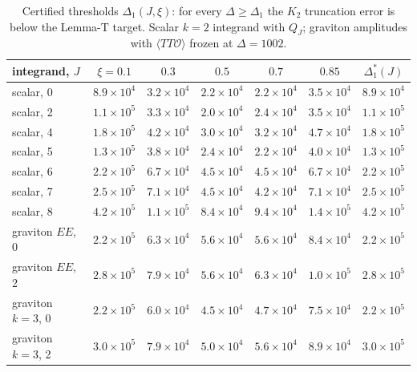 \documentclass[aps,prl,onecolumn,superscriptaddress,nofootinbib]{revtex4-2}
\begin{document}
\begin{table}[!htbp]
\caption{\label{tab:delta1}Certified thresholds $\Delta_1(J,\xi)$: for every $\Delta\ge\Delta_1$ the $K_2$ truncation error is below
the Lemma-T target. Scalar $k=2$ integrand with $Q_J$; graviton amplitudes with $\langle TT\mathcal O\rangle$ frozen at $\Delta=1002$.}
\footnotesize
\begin{ruledtabular}
\begin{tabular}{lcccccc}
integrand, $J$ & $\xi=0.1$ & $0.3$ & $0.5$ & $0.7$ & $0.85$ & $\Delta_1^*(J)$\\\hline
scalar, 0 & $8.9\times10^4$ & $3.2\times10^4$ & $2.2\times10^4$ & $2.2\times10^4$ & $3.5\times10^4$ & $8.9\times10^4$\\
scalar, 2 & $1.1\times10^5$ & $3.3\times10^4$ & $2.0\times10^4$ & $2.4\times10^4$ & $3.5\times10^4$ & $1.1\times10^5$\\
scalar, 4 & $1.8\times10^5$ & $4.2\times10^4$ & $3.0\times10^4$ & $3.2\times10^4$ & $4.7\times10^4$ & $1.8\times10^5$\\
scalar, 5 & $1.3\times10^5$ & $3.8\times10^4$ & $2.4\times10^4$ & $2.2\times10^4$ & $4.0\times10^4$ & $1.3\times10^5$\\
scalar, 6 & $2.2\times10^5$ & $6.7\times10^4$ & $4.5\times10^4$ & $4.5\times10^4$ & $6.7\times10^4$ & $2.2\times10^5$\\
scalar, 7 & $2.5\times10^5$ & $7.1\times10^4$ & $4.5\times10^4$ & $4.2\times10^4$ & $7.1\times10^4$ & $2.5\times10^5$\\
scalar, 8 & $4.2\times10^5$ & $1.1\times10^5$ & $8.4\times10^4$ & $9.4\times10^4$ & $1.4\times10^5$ & $4.2\times10^5$\\
graviton $EE$, 0 & $2.2\times10^5$ & $6.3\times10^4$ & $5.6\times10^4$ & $5.6\times10^4$ & $8.4\times10^4$ & $2.2\times10^5$\\
graviton $EE$, 2 & $2.8\times10^5$ & $7.9\times10^4$ & $5.6\times10^4$ & $6.3\times10^4$ & $1.0\times10^5$ & $2.8\times10^5$\\
graviton $k=3$, 0 & $2.2\times10^5$ & $6.0\times10^4$ & $4.5\times10^4$ & $4.7\times10^4$ & $7.5\times10^4$ & $2.2\times10^5$\\
graviton $k=3$, 2 & $3.0\times10^5$ & $7.9\times10^4$ & $5.0\times10^4$ & $5.6\times10^4$ & $8.9\times10^4$ & $3.0\times10^5$\\
\end{tabular}
\end{ruledtabular}
\end{table}
\end{document}
